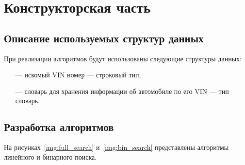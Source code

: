 \chapter{Конструкторская часть}

\section{Описание используемых структур данных}

При реализации алгоритмов будут использованы следующие структуры данных:

\begin{itemize}
	\item[---] искомый VIN номер --- строковый тип;
	\item[---] словарь для хранения информации об автомобиле по его VIN --- тип словарь.
\end{itemize}

\section{Разработка алгоритмов}

На рисунках~\ref{img:full_search} и~\ref{img:bin_search} представлены алгоритмы линейного и бинарного поиска.


